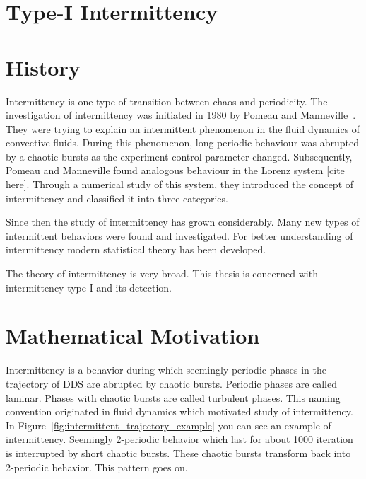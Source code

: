 \section{Type-I Intermittency}

\section{History}
Intermittency is one type of transition between chaos and periodicity.
The investigation of intermittency was initiated in 1980 by Pomeau and Manneville~\cite{Pomeau1980}.
They were trying to explain an intermittent phenomenon in the fluid dynamics of convective fluids.
During this phenomenon, long periodic behaviour was abrupted by a chaotic bursts as the experiment control parameter changed.
Subsequently, Pomeau and Manneville found analogous behaviour in the Lorenz system [cite here].
Through a numerical study of this system, they introduced the concept of intermittency and classified it into three categories.~\cite{Pomeau1980}
\par
Since then the study of intermittency has grown considerably.
Many new types of intermittent behaviors were found and investigated.
For better understanding of intermittency modern statistical theory has been developed.
~\cite{Elaskar2017}
\par
The theory of intermittency is very broad.
This thesis is concerned with intermittency type-I and its detection.

\section{Mathematical Motivation}
Intermittency is a behavior during which seemingly periodic phases in the trajectory of DDS are abrupted by chaotic bursts.
Periodic phases are called laminar.
Phases with chaotic bursts are called turbulent phases.
This naming convention originated in fluid dynamics which motivated study of intermittency.~\cite{Pomeau1980}
\\
In Figure~\ref{fig:intermittent_trajectory_example} you can see an example of intermittency.
Seemingly 2-periodic behavior which last for about 1000 iteration is interrupted by short chaotic bursts.
These chaotic bursts transform back into 2-periodic behavior.
This pattern goes on.


